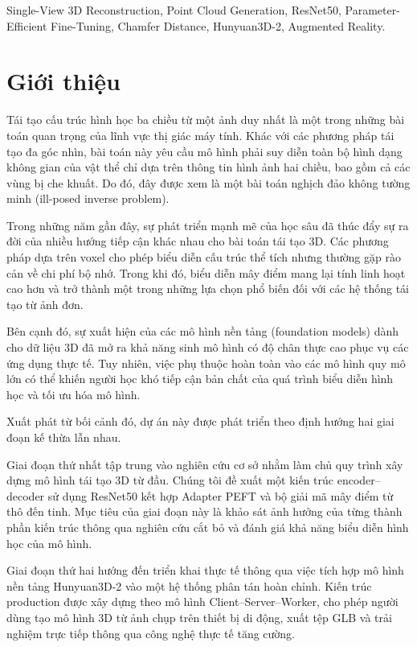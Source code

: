 \documentclass[conference,a4paper]{IEEEtran}
\begin{document}
\begin{IEEEkeywords}
Single-View 3D Reconstruction,
Point Cloud Generation,
ResNet50,
Parameter-Efficient Fine-Tuning,
Chamfer Distance,
Hunyuan3D-2,
Augmented Reality.
\end{IEEEkeywords}

\section{Giới thiệu}

Tái tạo cấu trúc hình học ba chiều từ một ảnh duy nhất là một trong những bài toán quan trọng của lĩnh vực thị giác máy tính. Khác với các phương pháp tái tạo đa góc nhìn, bài toán này yêu cầu mô hình phải suy diễn toàn bộ hình dạng không gian của vật thể chỉ dựa trên thông tin hình ảnh hai chiều, bao gồm cả các vùng bị che khuất. Do đó, đây được xem là một bài toán nghịch đảo không tường minh (ill-posed inverse problem).

Trong những năm gần đây, sự phát triển mạnh mẽ của học sâu đã thúc đẩy sự ra đời của nhiều hướng tiếp cận khác nhau cho bài toán tái tạo 3D. Các phương pháp dựa trên voxel cho phép biểu diễn cấu trúc thể tích nhưng thường gặp rào cản về chi phí bộ nhớ. Trong khi đó, biểu diễn mây điểm mang lại tính linh hoạt cao hơn và trở thành một trong những lựa chọn phổ biến đối với các hệ thống tái tạo từ ảnh đơn.

Bên cạnh đó, sự xuất hiện của các mô hình nền tảng (foundation models) dành cho dữ liệu 3D đã mở ra khả năng sinh mô hình có độ chân thực cao phục vụ các ứng dụng thực tế. Tuy nhiên, việc phụ thuộc hoàn toàn vào các mô hình quy mô lớn có thể khiến người học khó tiếp cận bản chất của quá trình biểu diễn hình học và tối ưu hóa mô hình.

Xuất phát từ bối cảnh đó, dự án này được phát triển theo định hướng hai giai đoạn kế thừa lẫn nhau.

Giai đoạn thứ nhất tập trung vào nghiên cứu cơ sở nhằm làm chủ quy trình xây dựng mô hình tái tạo 3D từ đầu. Chúng tôi đề xuất một kiến trúc encoder--decoder sử dụng ResNet50 kết hợp Adapter PEFT và bộ giải mã mây điểm từ thô đến tinh. Mục tiêu của giai đoạn này là khảo sát ảnh hưởng của từng thành phần kiến trúc thông qua nghiên cứu cắt bỏ và đánh giá khả năng biểu diễn hình học của mô hình.

Giai đoạn thứ hai hướng đến triển khai thực tế thông qua việc tích hợp mô hình nền tảng Hunyuan3D-2 vào một hệ thống phân tán hoàn chỉnh. Kiến trúc production được xây dựng theo mô hình Client--Server--Worker, cho phép người dùng tạo mô hình 3D từ ảnh chụp trên thiết bị di động, xuất tệp GLB và trải nghiệm trực tiếp thông qua công nghệ thực tế tăng cường.
\end{document}
